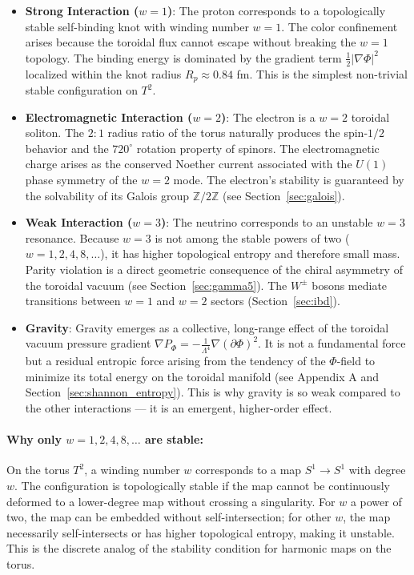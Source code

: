 \documentclass[12pt, a4paper]{article}
\begin{document}
\begin{itemize}
    \item \textbf{Strong Interaction ($w=1$)}: The proton corresponds to a topologically stable self-binding knot with winding number $w=1$. The color confinement arises because the toroidal flux cannot escape without breaking the $w=1$ topology. The binding energy is dominated by the gradient term $\frac{1}{2}|\nabla\Phi|^2$ localized within the knot radius $R_p \approx 0.84$ fm. This is the simplest non-trivial stable configuration on $T^2$.
    
    \item \textbf{Electromagnetic Interaction ($w=2$)}: The electron is a $w=2$ toroidal soliton. The $2:1$ radius ratio of the torus naturally produces the spin-$1/2$ behavior and the $720^\circ$ rotation property of spinors. The electromagnetic charge arises as the conserved Noether current associated with the $U(1)$ phase symmetry of the $w=2$ mode. The electron's stability is guaranteed by the solvability of its Galois group $\mathbb{Z}/2\mathbb{Z}$ (see Section~\ref{sec:galois}).
    
    \item \textbf{Weak Interaction ($w=3$)}: The neutrino corresponds to an unstable $w=3$ resonance. Because $w=3$ is not among the stable powers of two ($w=1,2,4,8,\dots$), it has higher topological entropy and therefore small mass. Parity violation is a direct geometric consequence of the chiral asymmetry of the toroidal vacuum (see Section~\ref{sec:gamma5}). The $W^\pm$ bosons mediate transitions between $w=1$ and $w=2$ sectors (Section~\ref{sec:ibd}).
    
    \item \textbf{Gravity}: Gravity emerges as a collective, long-range effect of the toroidal vacuum pressure gradient $\nabla P_\Phi = -\frac{1}{\Lambda^4}\nabla(\partial\Phi)^2$. It is not a fundamental force but a residual entropic force arising from the tendency of the $\Phi$-field to minimize its total energy on the toroidal manifold (see Appendix A and Section~\ref{sec:shannon_entropy}). This is why gravity is so weak compared to the other interactions — it is an emergent, higher-order effect.
\end{itemize}

\paragraph{Why only $w=1,2,4,8,\dots$ are stable:}
On the torus $T^2$, a winding number $w$ corresponds to a map $S^1 \to S^1$ with degree $w$. The configuration is topologically stable if the map cannot be continuously deformed to a lower-degree map without crossing a singularity. For $w$ a power of two, the map can be embedded without self-intersection; for other $w$, the map necessarily self-intersects or has higher topological entropy, making it unstable. This is the discrete analog of the stability condition for harmonic maps on the torus.
\end{document}
